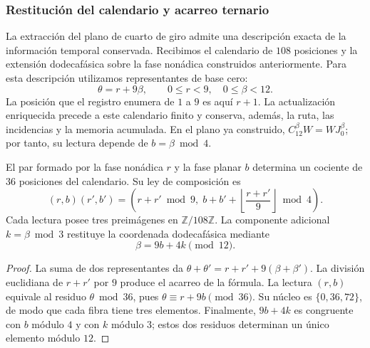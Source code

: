 \subsubsection{Restitución del calendario y acarreo ternario}
\label{ins29:xii:acarreo}

La extracción del plano de cuarto de giro admite una descripción exacta
de la información temporal conservada. Recibimos el calendario de
\(108\) posiciones y la extensión dodecafásica sobre la fase nonádica
construidos anteriormente. Para esta descripción utilizamos representantes
de base cero:
\[
 \theta=r+9\beta,\qquad 0\leq r<9,\quad 0\leq\beta<12.
\]
La posición que el registro enumera de \(1\) a \(9\) es aquí \(r+1\).
La actualización enriquecida precede a este calendario finito y conserva,
además, la ruta, las incidencias y la memoria acumulada. En el plano ya
construido, \(C_{12}^{\beta}W=WJ_0^{\beta}\); por tanto, su lectura depende
de \(b=\beta\bmod4\).

\begin{proposition}
\label{ins29:xii:fibra}
El par formado por la fase nonádica \(r\) y la fase planar \(b\) determina
un cociente de \(36\) posiciones del calendario. Su ley de composición es
\[
 (r,b)(r',b')=
 \left(r+r'\bmod9,\;
 b+b'+\left\lfloor\frac{r+r'}9\right\rfloor\bmod4\right).
\]
Cada lectura posee tres preimágenes en \(\mathbb Z/108\mathbb Z\).
La componente adicional \(k=\beta\bmod3\) restituye la coordenada
dodecafásica mediante
\[
 \beta=9b+4k\pmod{12}.
\]
\end{proposition}
\begin{proof}
La suma de dos representantes da
\(\theta+\theta'=r+r'+9(\beta+\beta')\). La división euclidiana de
\(r+r'\) por \(9\) produce el acarreo de la fórmula. La lectura
\((r,b)\) equivale al residuo \(\theta\bmod36\), pues
\(\theta\equiv r+9b\pmod{36}\). Su núcleo es
\(\{0,36,72\}\), de modo que cada fibra tiene tres elementos.
Finalmente, \(9b+4k\) es congruente con \(b\) módulo \(4\) y con
\(k\) módulo \(3\); estos dos residuos determinan un único elemento
módulo \(12\).
\end{proof}

